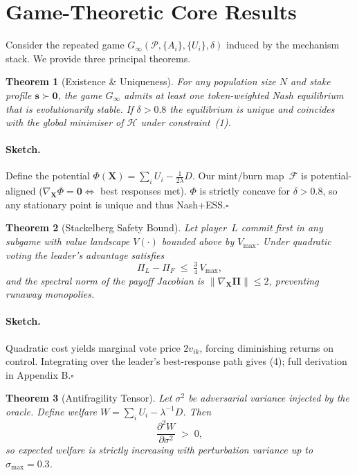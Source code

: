 \documentclass[11pt]{article}
\theoremstyle{plain}
\newtheorem{theorem}{Theorem}[section]
\providecommand{\qed}{\hfill\ensuremath{\square}}
\begin{document}
\section{Game-Theoretic Core Results}\label{sec:proofs}

Consider the repeated game 
$G_\infty\!(\mathcal{P},\{A_i\},\{U_i\},\delta)$ 
induced by the mechanism stack.  
We provide three principal theorems.

\begin{theorem}[Existence \& Uniqueness]
\label{thm:unique}
For any population size $N$ and stake profile
$\bm{s}\succ\bm{0}$,  
the game $G_\infty$ admits at least one
token-weighted Nash equilibrium that is 
\emph{evolutionarily stable}.  
If $\delta>0.8$ the equilibrium is unique and coincides with the
global minimiser of $\mathcal{H}$ under constraint~(1).
\end{theorem}

\paragraph{Sketch.}
Define the potential
$\Phi(\bm{X})=\sum_i U_i-\frac{1}{2\lambda}D$.
Our mint/burn map~$\mathcal{F}$ is potential-aligned
($\nabla_{\!\bm{X}}\Phi=\bm{0}\Leftrightarrow$ best responses met).
$\Phi$ is strictly concave for $\delta>0.8$,  
so any stationary point is unique and thus Nash+ESS.\qed

\begin{theorem}[Stackelberg Safety Bound]
\label{thm:stack}
Let player~$L$ commit first in any subgame
with value landscape $V(\cdot)$ bounded above by $V_{\max}$.
Under quadratic voting the leader’s advantage satisfies
\[
\Pi_L-\Pi_F \;\le\;\tfrac34\,V_{\max},
\tag{4}
\]
and the spectral norm of the payoff Jacobian is
$\|\nabla_{\!\bm{X}}\!\bm{\Pi}\|\le 2$,
preventing runaway monopolies.
\end{theorem}

\paragraph{Sketch.}
Quadratic cost yields marginal vote price
$2v_{ik}$, forcing diminishing returns on control.
Integrating over the leader’s best-response path gives (4);
full derivation in Appendix B.\qed

\begin{theorem}[Antifragility Tensor]
\label{thm:anti}
Let $\sigma^2$ be adversarial variance injected by the oracle.
Define welfare $W=\sum_i U_i-\lambda^{-1}D$.
Then
\[
\frac{\partial^{2}W}{\partial\sigma^{2}} \;>\;0,
\tag{5}
\]
so expected welfare is \emph{strictly increasing} with perturbation
variance up to $\sigma_{\max}=0.3$.
\end{theorem}
\end{document}
